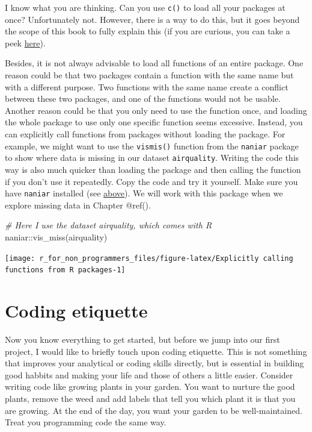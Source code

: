 \documentclass[
]{book}
\newenvironment{Shaded}{\begin{snugshade}}{\end{snugshade}}
\newcommand{\CommentTok}[1]{\textcolor[rgb]{0.56,0.35,0.01}{\textit{#1}}}
\newcommand{\FunctionTok}[1]{\textcolor[rgb]{0.00,0.00,0.00}{#1}}
\newcommand{\NormalTok}[1]{#1}
\newcommand{\SpecialCharTok}[1]{\textcolor[rgb]{0.00,0.00,0.00}{#1}}
\begin{document}
I know what you are thinking. Can you use \texttt{c()} to load all your packages at once? Unfortunately not. However, there is a way to do this, but it goes beyond the scope of this book to fully explain this (if you are curious, you can take a peek \href{https://stackoverflow.com/questions/8175912/load-multiple-packages-at-once}{here}).

Besides, it is not always advisable to load all functions of an entire package. One reason could be that two packages contain a function with the same name but with a different purpose. Two functions with the same name create a conflict between these two packages, and one of the functions would not be usable. Another reason could be that you only need to use the function once, and loading the whole package to use only one specific function seems excessive. Instead, you can explicitly call functions from packages without loading the package. For example, we might want to use the \texttt{vismis()} function from the \texttt{naniar} package to show where data is missing in our dataset \texttt{airquality}. Writing the code this way is also much quicker than loading the package and then calling the function if you don't use it repeatedly. Copy the code and try it yourself. Make sure you have \texttt{naniar} installed (see \protect\hyperlink{install-packages-tidyverse-nanair-psych}{above}). We will work with this package when we explore missing data in Chapter @ref().

\begin{Shaded}
\begin{Highlighting}[]
\CommentTok{\# Here I use the dataset \textquotesingle{}airquality\textquotesingle{}, which comes with R}
\NormalTok{naniar}\SpecialCharTok{::}\FunctionTok{vis\_miss}\NormalTok{(airquality)}
\end{Highlighting}
\end{Shaded}

\begin{center}\texttt{[image: r\_for\_non\_programmers\_files/figure-latex/Explicitly calling functions from R packages-1]} \end{center}

\hypertarget{coding-etiquette}{%
\section{Coding etiquette}\label{coding-etiquette}}

Now you know everything to get started, but before we jump into our first project, I would like to briefly touch upon coding etiquette. This is not something that improves your analytical or coding skills directly, but is essential in building good habbits and making your life and those of others a little easier. Consider writing code like growing plants in your garden. You want to nurture the good plants, remove the weed and add labels that tell you which plant it is that you are growing. At the end of the day, you want your garden to be well-maintained. Treat you programming code the same way.
\end{document}
